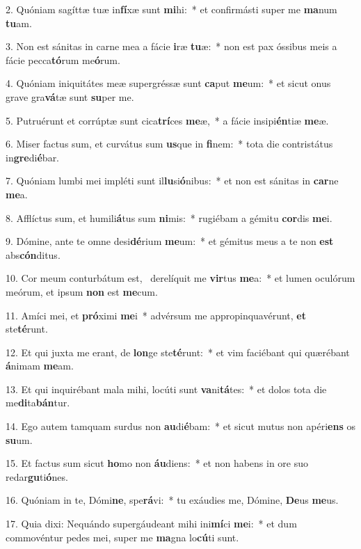 2. Quóniam sagíttæ tuæ in\textbf{fí}xæ sunt \textbf{mi}hi:~*  et confirmásti super me \textbf{ma}num \textbf{tu}am.\

3. Non est sánitas in carne mea a fácie \textbf{i}ræ \textbf{tu}æ:~*  non est pax óssibus meis a fácie pecca\textbf{tó}rum me\textbf{ó}rum.\

4. Quóniam iniquitátes meæ supergréssæ sunt \textbf{ca}put \textbf{me}um:~*  et sicut onus grave gra\textbf{vá}tæ sunt \textbf{su}per me.\

5. Putruérunt et corrúptæ sunt cica\textbf{trí}ces \textbf{me}æ,~*  a fácie insipi\textbf{én}tiæ \textbf{me}æ.\

6. Miser factus sum, et curvátus sum \textbf{us}que in \textbf{fi}nem:~*  tota die contristátus in\textbf{gre}di\textbf{é}bar.\

7. Quóniam lumbi mei impléti sunt il\textbf{lu}si\textbf{ó}nibus:~*  et non est sánitas in \textbf{car}ne \textbf{me}a.\

8. Afflíctus sum, et humili\textbf{á}tus sum \textbf{ni}mis:~*  rugiébam a gémitu \textbf{cor}dis \textbf{me}i.\

9. Dómine, ante te omne desi\textbf{dé}rium \textbf{me}um:~*  et gémitus meus a te non \textbf{est} abs\textbf{cón}ditus.\

10. Cor meum conturbátum est, \dag\  derelíquit me \textbf{vir}tus \textbf{me}a:~*  et lumen oculórum meórum, et ipsum \textbf{non} est \textbf{me}cum.\

11. Amíci mei, et \textbf{pró}ximi \textbf{me}i~*  advérsum me appropinquavérunt, \textbf{et} ste\textbf{té}runt.\

12. Et qui juxta me erant, de \textbf{lon}ge ste\textbf{té}runt:~*  et vim faciébant qui quærébant \textbf{á}nimam \textbf{me}am.\

13. Et qui inquirébant mala mihi, locúti sunt \textbf{va}ni\textbf{tá}tes:~*  et dolos tota die me\textbf{di}ta\textbf{bán}tur.\

14. Ego autem tamquam surdus non \textbf{au}di\textbf{é}bam:~*  et sicut mutus non apéri\textbf{ens} os \textbf{su}um.\

15. Et factus sum sicut \textbf{ho}mo non \textbf{áu}diens:~*  et non habens in ore suo redar\textbf{gu}ti\textbf{ó}nes.\

16. Quóniam in te, Dómi\textbf{ne}, spe\textbf{rá}vi:~*  tu exáudies me, Dómine, \textbf{De}us \textbf{me}us.\

17. Quia dixi: Nequándo supergáudeant mihi ini\textbf{mí}ci \textbf{me}i:~*  et dum commovéntur pedes mei, super me \textbf{ma}gna lo\textbf{cú}ti sunt.\

